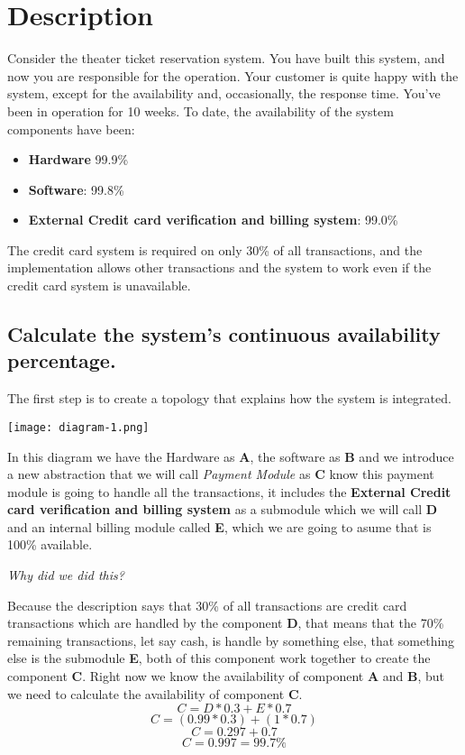 \section{Description}
Consider the theater ticket reservation system.  You have built this system, 
and now you are responsible for the operation.  Your customer is quite happy 
with the system, except for the availability and, occasionally, the response 
time.  You’ve been in operation for 10 weeks.  To date, the availability of the
system components have been:
\begin{itemize}
    \item \textbf{Hardware} 99.9\%
    \item \textbf{Software}: 99.8\%
    \item \textbf{External Credit card verification and billing system}: 99.0\%
\end{itemize}
\noindent
The credit card system is required on only 30\% of all transactions, and the 
implementation allows other transactions and the system to work even if the 
credit card system is unavailable.

\pagebreak

\subsection{Calculate the system’s continuous availability percentage.}
The first step is to create a topology that explains how the system is integrated.
\begin{center}
    \texttt{[image: diagram-1.png]}    
\end{center}
\noindent
In this diagram we have the Hardware as \textbf{A}, the software as \textbf{B} 
and we introduce a new abstraction that we will call \textit{Payment Module} as 
\textbf{C} know this payment module is going to handle all the transactions, it 
includes the \textbf{External Credit card verification and billing system} as a
submodule which we will call \textbf{D} and an internal billing module called 
\textbf{E}, which we are going to asume that is 100\% available. \newline\newline
\pagebreak

\noindent
\textit{Why did we did this?}\newline\newline

\noindent
Because the description says that 30\% of all transactions 
are credit card transactions which are handled by the component \textbf{D}, that 
means that the 70\% remaining transactions, let say cash, is handle by something 
else, that something else is the submodule \textbf{E}, both of this component 
work together to create the component \textbf{C}.\newline\newline
\noindent
Right now we know the availability of component \textbf{A} and \textbf{B}, but 
we need to calculate the availability of component \textbf{C}.
\[ C = D * 0.3 + E * 0.7 \]
\[ C = (0.99 * 0.3) + (1 * 0.7) \]
\[ C =  0.297 + 0.7 \]
\[ C =  0.997 = 99.7\% \]

